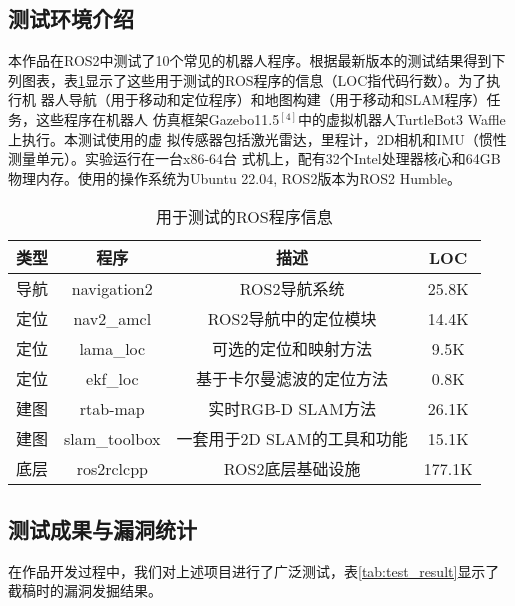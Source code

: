 \subsection{测试环境介绍}
本作品在ROS2中测试了10个常见的机器人程序。根据最新版本的测试结果得到下列图表，表\ref{tb:ros_test}显示了这些用于测试的ROS程序的信息（LOC指代码行数）。为了执行机
器人导航（用于移动和定位程序）和地图构建（用于移动和SLAM程序）任务，这些程序在机器人
仿真框架Gazebo11.5$^{[4]}$中的虚拟机器人TurtleBot3 Waffle上执行。本测试使用的虚
拟传感器包括激光雷达，里程计，2D相机和IMU（惯性测量单元）。实验运行在一台x86-64台
式机上，配有32个Intel处理器核心和64GB物理内存。使用的操作系统为Ubuntu 22.04,
ROS2版本为ROS2 Humble。
\begin{table}[H]
	\small
	\caption{用于测试的ROS程序信息}
	\label{tb:ros_test}
	\centering
	\begin{tabular}{cccc}
		\hline  
		\textbf{类型} & \textbf{程序} & \textbf{描述} & \textbf{LOC} \\ 
		\hline  
    导航 & navigation2 & ROS2导航系统 & 25.8K \\
		定位 & nav2\_amcl & ROS2导航中的定位模块 & 14.4K \\
		定位 & lama\_loc & 可选的定位和映射方法 & 9.5K \\
		定位 & ekf\_loc & 基于卡尔曼滤波的定位方法 & 0.8K \\
		建图 & rtab-map & 实时RGB-D SLAM方法 & 26.1K \\
		建图 & slam\_toolbox & 一套用于2D SLAM的工具和功能 & 15.1K \\
    底层 & ros2rclcpp & ROS2底层基础设施 & 177.1K \\
		\hline
	\end{tabular} 
\end{table}

\subsection{测试成果与漏洞统计}
在作品开发过程中，我们对上述项目进行了广泛测试，表\ref{tab:test_result}显示了
截稿时的漏洞发掘结果。

